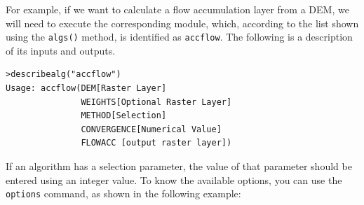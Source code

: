 For example, if we want to calculate a flow accumulation layer from a DEM, we will need to execute the corresponding module, which, according to the list shown using the \texttt{algs()} method, is identified as \texttt{accflow}. The following is a description of its inputs and outputs.

\begin{verbatim}
>describealg("accflow")
Usage: accflow(DEM[Raster Layer]
               WEIGHTS[Optional Raster Layer]
               METHOD[Selection]
               CONVERGENCE[Numerical Value]
               FLOWACC [output raster layer])  
\end{verbatim}    

If an algorithm has a selection parameter, the value of that parameter should be entered using an integer value. To know the available options, you can use the \texttt{options} command, as shown in the following example:

